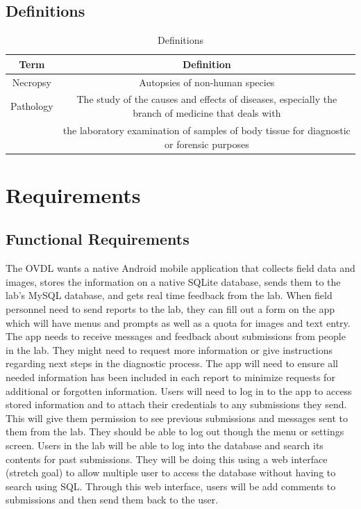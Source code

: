 \documentclass[onecolumn, draftclsnofoot,10pt, compsoc]{IEEEtran}
\begin{document}
\subsection{Definitions}
\begin{table}[ht]
\caption{Definitions}
\centering
\begin{tabular}{c|c}
\hline
    Term  &  Definition\\
    \hline
    \hline
    Necropsy   &   Autopsies of non-human species\\
    \hline
    Pathology    &   The study of the causes and effects of diseases, especially the branch of medicine that deals with \\
    & the laboratory examination of samples of body tissue for diagnostic or forensic purposes\\
    \hline
\end{tabular}
\end{table}

\section{Requirements}
\subsection{Functional Requirements}
The OVDL wants a native Android mobile application that collects field data and images, stores the information on a native SQLite database, sends them to the lab's MySQL database, and gets real time feedback from the lab. 
When field personnel need to send reports to the lab, they can fill out a form on the app which will have menus and prompts as well as a quota for images and text entry.
\newline
The app needs to receive messages and feedback about submissions from people in the lab. 
They might need to request more information or give instructions regarding next steps in the diagnostic process. 
The app will need to ensure all needed information has been included in each report to minimize requests for additional or forgotten information. 
\newline
Users will need to log in to the app to access stored information and to attach their credentials to any submissions they send. This will give them permission to see previous submissions and messages sent to them from the lab. 
They should be able to log out though the menu or settings screen. 
\newline 
Users in the lab will be able to log into the database and search its contents for past submissions. They will be doing this using a web interface (stretch goal) to allow multiple user to access the database without having to search using SQL. Through this web interface, users will be add comments to submissions and then send them back to the user. 
\end{document}
